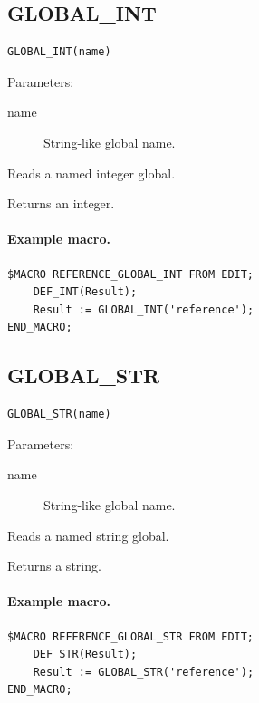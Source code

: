 \documentclass[a4paper,10pt,twoside,openany]{book}
\newenvironment{mrmacextension}{\begin{changebar}}{\end{changebar}}
\begin{document}
\begin{mrmacextension}
\label{prim:intrinsic-global-int}
\subsection*{GLOBAL\_INT}
\begin{verbatim}
GLOBAL_INT(name)
\end{verbatim}
Parameters:
\begin{description}
\item[name] String-like global name.
\end{description}

Reads a named integer global.

Returns an integer.

\paragraph{Example macro.}
\begin{verbatim}
$MACRO REFERENCE_GLOBAL_INT FROM EDIT;
    DEF_INT(Result);
    Result := GLOBAL_INT('reference');
END_MACRO;
\end{verbatim}
\end{mrmacextension}

\begin{mrmacextension}
\label{prim:intrinsic-global-str}
\subsection*{GLOBAL\_STR}
\begin{verbatim}
GLOBAL_STR(name)
\end{verbatim}
Parameters:
\begin{description}
\item[name] String-like global name.
\end{description}

Reads a named string global.

Returns a string.

\paragraph{Example macro.}
\begin{verbatim}
$MACRO REFERENCE_GLOBAL_STR FROM EDIT;
    DEF_STR(Result);
    Result := GLOBAL_STR('reference');
END_MACRO;
\end{verbatim}
\end{mrmacextension}
\end{document}
